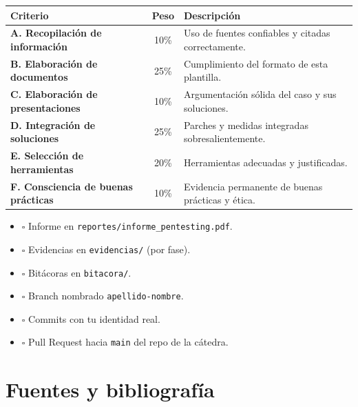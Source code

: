 \documentclass[11pt,a4paper]{article}
\begin{document}
\begin{center}
\renewcommand{\arraystretch}{1.3}
\begin{tabularx}{\textwidth}{@{} l c X @{}}
\toprule
\textbf{Criterio} & \textbf{Peso} & \textbf{Descripción} \\
\midrule
\textbf{A. Recopilación de información} & 10\% & Uso de fuentes confiables y citadas correctamente. \\
\textbf{B. Elaboración de documentos} & 25\% & Cumplimiento del formato de esta plantilla. \\
\textbf{C. Elaboración de presentaciones} & 10\% & Argumentación sólida del caso y sus soluciones. \\
\textbf{D. Integración de soluciones} & 25\% & Parches y medidas integradas sobresalientemente. \\
\textbf{E. Selección de herramientas} & 20\% & Herramientas adecuadas y justificadas. \\
\textbf{F. Consciencia de buenas prácticas} & 10\% & Evidencia permanente de buenas prácticas y ética. \\
\bottomrule
\end{tabularx}
\end{center}

\begin{tip}
\begin{itemize}[leftmargin=*]
  \item $\square$ Informe en \texttt{reportes/informe\_pentesting.pdf}.
  \item $\square$ Evidencias en \texttt{evidencias/} (por fase).
  \item $\square$ Bitácoras en \texttt{bitacora/}.
  \item $\square$ Branch nombrado \texttt{apellido-nombre}.
  \item $\square$ Commits con tu identidad real.
  \item $\square$ Pull Request hacia \texttt{main} del repo de la cátedra.
\end{itemize}
\end{tip}

\section{Fuentes y bibliografía}
\end{document}
